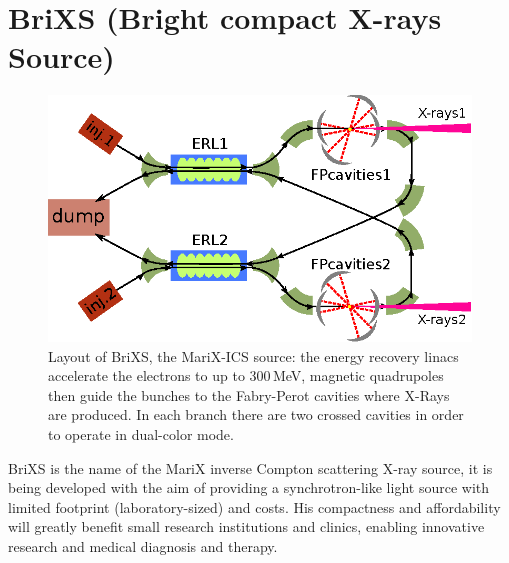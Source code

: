 \section{BriXS (Bright compact X-rays Source)}
\begin{figure}
	\centering
	\includegraphics[width=0.9\linewidth]{images/BriXS.eps}
	\caption{Layout of BriXS, the MariX-ICS source: the energy recovery linacs accelerate the electrons to up to 300\,MeV, magnetic quadrupoles then guide the bunches to the Fabry-Perot cavities where X-Rays are produced. In each branch there are two crossed cavities in order to operate in dual-color mode.}
	\label{fig:brixs}
\end{figure}
BriXS is the name of the MariX inverse Compton scattering X-ray source, it is being developed with the aim of providing a synchrotron-like light source with limited footprint (laboratory-sized) and costs. His compactness and affordability will greatly benefit small research institutions and clinics, enabling innovative research and medical diagnosis and therapy.


